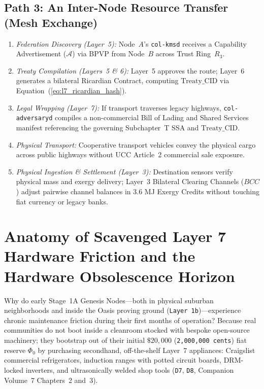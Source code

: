\subsection{Path 3: An Inter-Node Resource Transfer (Mesh Exchange)}
\begin{enumerate}
  \item \textit{Federation Discovery (Layer~5):} Node~$A$'s \texttt{col-kmsd} receives a Capability Advertisement ($\mathcal{A}$) via BPVP from Node~$B$ across Trust Ring~$R_3$.
  \item \textit{Treaty Compilation (Layers~5 \& 6):} Layer~5 approves the route; Layer~6 generates a bilateral Ricardian Contract, computing $\mathrm{Treaty\_CID}$ via Equation~(\ref{eq:l7_ricardian_hash}).
  \item \textit{Legal Wrapping (Layer~7):} If transport traverses legacy highways, \texttt{col-adversaryd} compiles a non-commercial Bill of Lading and Shared Services manifest referencing the governing Subchapter~T SSA and $\mathrm{Treaty\_CID}$.
  \item \textit{Physical Transport:} Cooperative transport vehicles convey the physical cargo across public highways without UCC Article~2 commercial sale exposure.
  \item \textit{Physical Ingestion \& Settlement (Layer~3):} Destination sensors verify physical mass and exergy delivery; Layer~3 Bilateral Clearing Channels ($BCC$) adjust pairwise channel balances in 3.6 MJ Exergy Credits without touching fiat currency or legacy banks.
\end{enumerate}

\section{Anatomy of Scavenged Layer 7 Hardware Friction and the Hardware Obsolescence Horizon}
\label{sec:l7-hardware-friction}

Why do early Stage~1A Genesis Nodes---both in physical suburban neighborhoods and inside the Oasis proving ground (\texttt{Layer 1b})---experience chronic maintenance friction during their first months of operation? Because real communities do not boot inside a cleanroom stocked with bespoke open-source machinery; they bootstrap out of their initial $\$20{,}000$ (\texttt{2,000,000 cents}) fiat reserve $\Phi_0$ by purchasing secondhand, off-the-shelf Layer~7 appliances: Craigslist commercial refrigerators, induction ranges with potted circuit boards, DRM-locked inverters, and ultrasonically welded shop tools (\texttt{D7}, \texttt{D8}, Companion Volume~7 Chapters~2 and~3).

